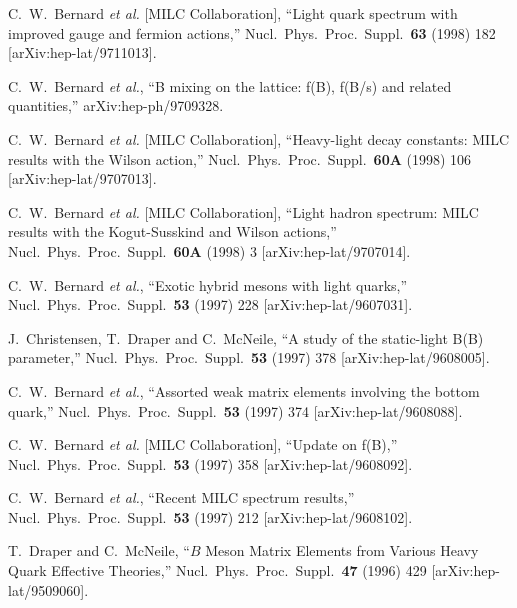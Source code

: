 \begin{thebibliography}{130}
C.~W.~Bernard {\it et al.}  [MILC Collaboration],
``Light quark spectrum with improved gauge and fermion actions,''
Nucl.\ Phys.\ Proc.\ Suppl.\  {\bf 63} (1998) 182
[arXiv:hep-lat/9711013].

C.~W.~Bernard {\it et al.},
``B mixing on the lattice: f(B), f(B/s) and related quantities,''
arXiv:hep-ph/9709328.

C.~W.~Bernard {\it et al.}  [MILC Collaboration],
``Heavy-light decay constants: MILC results with the Wilson action,''
Nucl.\ Phys.\ Proc.\ Suppl.\  {\bf 60A} (1998) 106
[arXiv:hep-lat/9707013].

C.~W.~Bernard {\it et al.}  [MILC Collaboration],
``Light hadron spectrum: MILC results with the Kogut-Susskind and Wilson  actions,''
Nucl.\ Phys.\ Proc.\ Suppl.\  {\bf 60A} (1998) 3
[arXiv:hep-lat/9707014].


C.~W.~Bernard {\it et al.},
``Exotic hybrid mesons with light quarks,''
Nucl.\ Phys.\ Proc.\ Suppl.\  {\bf 53} (1997) 228
[arXiv:hep-lat/9607031].


J.~Christensen, T.~Draper and C.~McNeile,
``A study of the static-light B(B) parameter,''
Nucl.\ Phys.\ Proc.\ Suppl.\  {\bf 53} (1997) 378
[arXiv:hep-lat/9608005].

C.~W.~Bernard {\it et al.},
``Assorted weak matrix elements involving the bottom quark,''
Nucl.\ Phys.\ Proc.\ Suppl.\  {\bf 53} (1997) 374
[arXiv:hep-lat/9608088].

C.~W.~Bernard {\it et al.}  [MILC Collaboration],
``Update on f(B),''
Nucl.\ Phys.\ Proc.\ Suppl.\  {\bf 53} (1997) 358
[arXiv:hep-lat/9608092].

C.~W.~Bernard {\it et al.},
``Recent MILC spectrum results,''
Nucl.\ Phys.\ Proc.\ Suppl.\  {\bf 53} (1997) 212
[arXiv:hep-lat/9608102].

T.~Draper and C.~McNeile,
``$B$ Meson Matrix Elements from Various Heavy Quark Effective Theories,''
Nucl.\ Phys.\ Proc.\ Suppl.\  {\bf 47} (1996) 429
[arXiv:hep-lat/9509060].


\end{thebibliography}

